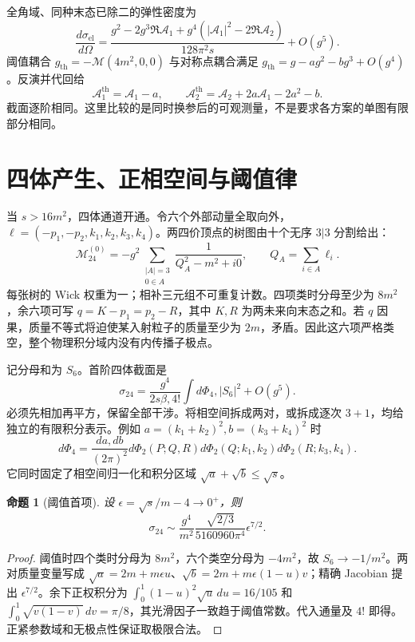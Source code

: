 \documentclass[11pt,a4paper,oneside]{ctexrep}
\theoremstyle{cnplain}
\newtheorem{proposition}[theorem]{命题}
\theoremstyle{definition}
\theoremstyle{remark}
\begin{document}
全角域、同种末态已除二的弹性密度为
\begin{equation}
 \frac{d\sigma_{\mathrm{el}}}{d\Omega}
 =\frac{g^2-2g^3\Re\mathcal A_1+
 g^4(|\mathcal A_1|^2-2\Re\mathcal A_2)}{128\pi^2s}+O(g^5).
\end{equation}
阈值耦合 $g_{\mathrm{th}}=-\mathcal M(4m^2,0,0)$ 与对称点耦合满足 $g_{\mathrm{th}}=g-ag^2-bg^3+O(g^4)$。反演并代回给
\begin{equation}
 \mathcal A_1^{\mathrm{th}}=\mathcal A_1-a,\qquad
 \mathcal A_2^{\mathrm{th}}=\mathcal A_2+2a\mathcal A_1-2a^2-b.
\end{equation}
截面逐阶相同。这里比较的是同时换参后的可观测量，不是要求各方案的单图有限部分相同。

\section{四体产生、正相空间与阈值律}
当 $s>16m^2$，四体通道开通。令六个外部动量全取向外，$\ell=(-p_1,-p_2,k_1,k_2,k_3,k_4)$。两四价顶点的树图由十个无序 $3|3$ 分割给出：
\begin{equation}
 \mathcal M_{24}^{(0)}=-g^2\sum_{\substack{|A|=3\\0\in A}}
 \frac1{Q_A^2-m^2+i0},\qquad Q_A=\sum_{i\in A}\ell_i.
\end{equation}
每张树的 Wick 权重为一；相补三元组不可重复计数。四项类时分母至少为 $8m^2$，余六项可写 $q=K-p_1=p_2-R$，其中 $K,R$ 为两未来向末态之和。若 $q$ 因果，质量不等式将迫使某入射粒子的质量至少为 $2m$，矛盾。因此这六项严格类空，整个物理积分域内没有内传播子极点。

记分母和为 $S_6$。首阶四体截面是
\begin{equation}
 \sigma_{24}=\frac{g^4}{2s\beta,4!}\int d\Phi_4,|S_6|^2+O(g^5).
\end{equation}
必须先相加再平方，保留全部干涉。将相空间拆成两对，或拆成逐次 $3+1$，均给独立的有限积分表示。例如 $a=(k_1+k_2)^2,b=(k_3+k_4)^2$ 时
\begin{equation}
 d\Phi_4=\frac{da,db}{(2\pi)^2}
 d\Phi_2(P;Q,R)d\Phi_2(Q;k_1,k_2)d\Phi_2(R;k_3,k_4).
\end{equation}
它同时固定了相空间归一化和积分区域 $\sqrt a+\sqrt b\le\sqrt s$。

\begin{proposition}[阈值首项]
设 $\epsilon=\sqrt s/m-4\to0^+$，则
\begin{equation}
 \sigma_{24}\sim\frac{g^4}{m^2}
 \frac{\sqrt{2/3}}{5160960\pi^4}\epsilon^{7/2}.
\end{equation}
\end{proposition}
\begin{proof}
阈值时四个类时分母为 $8m^2$，六个类空分母为 $-4m^2$，故 $S_6\to-1/m^2$。两对质量变量写成 $\sqrt a=2m+m\epsilon u$、$\sqrt b=2m+m\epsilon(1-u)v$；精确 Jacobian 提出 $\epsilon^{7/2}$。余下正权积分为 $\int_0^1(1-u)^2\sqrt u\,du=16/105$ 和 $\int_0^1\sqrt{v(1-v)}\,dv=\pi/8$，其光滑因子一致趋于阈值常数。代入通量及 $4!$ 即得。正紧参数域和无极点性保证取极限合法。
\end{proof}
\end{document}
